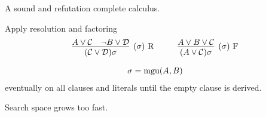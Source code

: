 
		A sound and refutation complete calculus.
	\END
	
	\BEGINX
		Apply resolution and factoring
		\begin{gather*}
			\infer
			[(\sigma)\text{ R}]
			{(\mcC \lor \mcD)\sigma}
			{{A} \lor\mcC & {\lnot B} \lor\mcD}
			\hspace{1cm}
			\infer
			[(\sigma)\text{ F}]
			{(A \lor \mcC)\sigma}
			{{A}\lor B\lor\mcC} \\[0.7em]
			\sigma = \mgu(A,B)
		\end{gather*}
		eventually on all clauses and literals until the empty clause is derived.
	\ENDX
	
		Search space grows too fast.
	\END